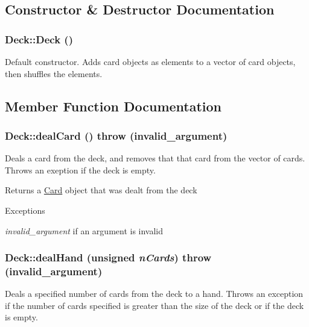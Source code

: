 \subsection{Constructor \& Destructor Documentation}
\hypertarget{classDeck_a57ae1cb4ac6fd61c249cefb2db85eb99}{
\subsubsection[{Deck}]{\setlength{\rightskip}{0pt plus 5cm}Deck::Deck ()}}
\label{classDeck_a57ae1cb4ac6fd61c249cefb2db85eb99}
Default constructor. Adds card objects as elements to a vector of card objects, then shuffles the elements. 

\subsection{Member Function Documentation}
\hypertarget{classDeck_a7a0547af6395feb13f4402a2a63b79fe}{
\subsubsection[{dealCard}]{ Deck::dealCard ()  throw (invalid\_\-argument)}}
\label{classDeck_a7a0547af6395feb13f4402a2a63b79fe}
Deals a card from the deck, and removes that that card from the vector of cards. Throws an exeption if the deck is empty.

\begin{DoxyReturn}{Returns}
a \hyperlink{classCard}{Card} object that was dealt from the deck 
\end{DoxyReturn}

\begin{DoxyExceptions}{Exceptions}
\item[{\em invalid\_\-argument}]if an argument is invalid \end{DoxyExceptions}
\hypertarget{classDeck_a6b5adf60851c8e28c5d6315e3616e8e2}{
\subsubsection[{dealHand}]{ Deck::dealHand (unsigned {\em nCards})  throw (invalid\_\-argument)}}
\label{classDeck_a6b5adf60851c8e28c5d6315e3616e8e2}
Deals a specified number of cards from the deck to a hand. Throws an exception if the number of cards specified is greater than the size of the deck or if the deck is empty.


